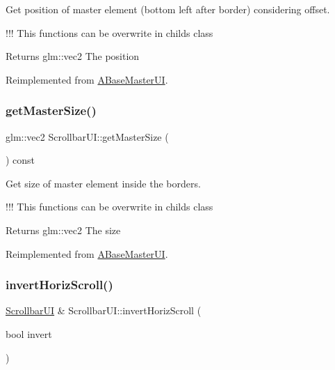 Get position of master element (bottom left after border) considering offset. 

!!! This functions can be overwrite in childs class

\begin{DoxyReturn}{Returns}
glm\+::vec2 The position 
\end{DoxyReturn}


Reimplemented from \hyperlink{class_a_base_master_u_i_a64cf45d76b377fd59ec19f1f1d53c0be}{A\+Base\+Master\+UI}.

\mbox{\label{class_scrollbar_u_i_ad9f2de5f7fbb4acdfe25fc2dbe3eb943}} 
\subsubsection{\texorpdfstring{get\+Master\+Size()}{getMasterSize()}}
{\footnotesize\ttfamily glm\+::vec2 Scrollbar\+U\+I\+::get\+Master\+Size (\begin{DoxyParamCaption}{ }\end{DoxyParamCaption}) const\hspace{0.3cm}{\ttfamily [virtual]}}



Get size of master element inside the borders. 

!!! This functions can be overwrite in childs class

\begin{DoxyReturn}{Returns}
glm\+::vec2 The size 
\end{DoxyReturn}


Reimplemented from \hyperlink{class_a_base_master_u_i_ad8e2ca2b3f67ca274e5dd0169e454e55}{A\+Base\+Master\+UI}.

\mbox{\label{class_scrollbar_u_i_a7af0e6e6a2cde698fe84d516761c47aa}} 
\subsubsection{\texorpdfstring{invert\+Horiz\+Scroll()}{invertHorizScroll()}}
{\footnotesize\ttfamily \hyperlink{class_scrollbar_u_i}{Scrollbar\+UI} \& Scrollbar\+U\+I\+::invert\+Horiz\+Scroll (\begin{DoxyParamCaption}\item[{bool}]{invert }\end{DoxyParamCaption})}



